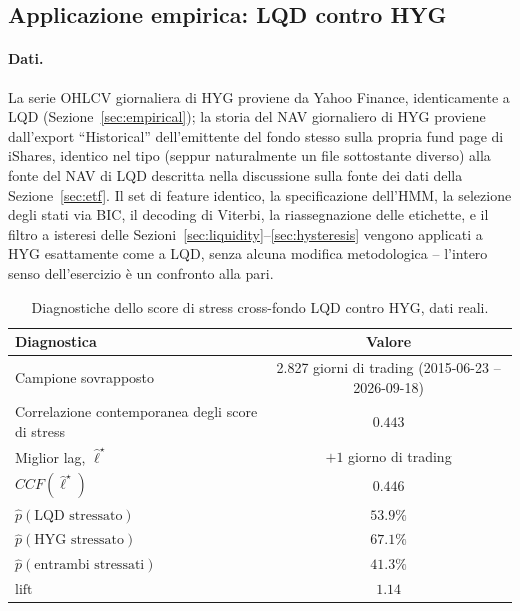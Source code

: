\documentclass[11pt]{article}
\theoremstyle{definition}
\theoremstyle{remark}
\begin{document}
\subsection{Applicazione empirica: LQD contro HYG}
\label{sec:crossetf-real}

\paragraph{Dati.} La serie OHLCV giornaliera di HYG proviene da Yahoo Finance, identicamente a LQD (Sezione~\ref{sec:empirical}); la storia del NAV giornaliero di HYG proviene dall'export ``Historical'' dell'emittente del fondo stesso sulla propria fund page di iShares, identico nel tipo (seppur naturalmente un file sottostante diverso) alla fonte del NAV di LQD descritta nella discussione sulla fonte dei dati della Sezione~\ref{sec:etf}. Il set di feature identico, la specificazione dell'HMM, la selezione degli stati via BIC, il decoding di Viterbi, la riassegnazione delle etichette, e il filtro a isteresi delle Sezioni~\ref{sec:liquidity}--\ref{sec:hysteresis} vengono applicati a HYG esattamente come a LQD, senza alcuna modifica metodologica -- l'intero senso dell'esercizio \`e un confronto alla pari.

\begin{table}[H]
\centering
\caption{Diagnostiche dello score di stress cross-fondo LQD contro HYG, dati reali.}
\label{tab:crossetf-real}
\begin{tabular}{lc}
\toprule
Diagnostica & Valore \\
\midrule
Campione sovrapposto & 2.827 giorni di trading (2015-06-23 -- 2026-09-18) \\
Correlazione contemporanea degli score di stress & $0.443$ \\
Miglior lag, $\widehat\ell^\star$ & $+1$ giorno di trading \\
$CCF(\widehat\ell^\star)$ & $0.446$ \\
$\widehat p(\text{LQD stressato})$ & $53.9\%$ \\
$\widehat p(\text{HYG stressato})$ & $67.1\%$ \\
$\widehat p(\text{entrambi stressati})$ & $41.3\%$ \\
$\mathrm{lift}$ & $1.14$ \\
\bottomrule
\end{tabular}
\end{table}
\end{document}
